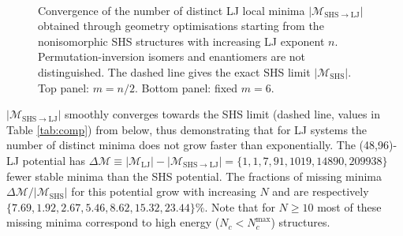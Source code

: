 \begin{figure}
    \centering
    \\
    \caption{
    Convergence of the number of distinct LJ local minima
    $|\mathcal{M}_\mathrm{SHS\to LJ}|$ obtained through geometry
    optimisations starting from the nonisomorphic \acs{SHS} structures with
    increasing LJ exponent $n$.  Permutation-inversion isomers and enantiomers
    are not distinguished.     The dashed line gives the exact \acs{SHS} limit
    $|\mathcal{M}_\mathrm{SHS}|$.  Top panel: $m=n/2$. Bottom panel: fixed
    $m=6$.}
    \label{fig:expinfty}
\end{figure}

$|\mathcal{M}_\mathrm{SHS\to LJ}|$ smoothly  converges towards the \ac{SHS} limit (dashed line, values in Table \ref{tab:comp}) from below, 
thus demonstrating that for LJ systems the number of distinct minima does not grow faster than exponentially.  
The (48,96)-LJ potential has $\Delta\mathcal{M} \equiv |\mathcal{M}_\mathrm{LJ}| - |\mathcal{M}_\mathrm{SHS\to LJ}| = \{1,1,7,91,1019,14890,209938\}$ fewer stable minima than the \ac{SHS} potential.
The fractions of missing minima $\Delta\mathcal{M}/|\mathcal{M}_\mathrm{SHS}|$ for this potential grow with increasing $N$ and are respectively $\{7.69,1.92,2.67,5.46,8.62,15.32,23.44\}\%$.  Note that for $N \geq 10$ most of these missing minima correspond to high energy ($N_c < N_c^\mathrm{max}$) structures.


